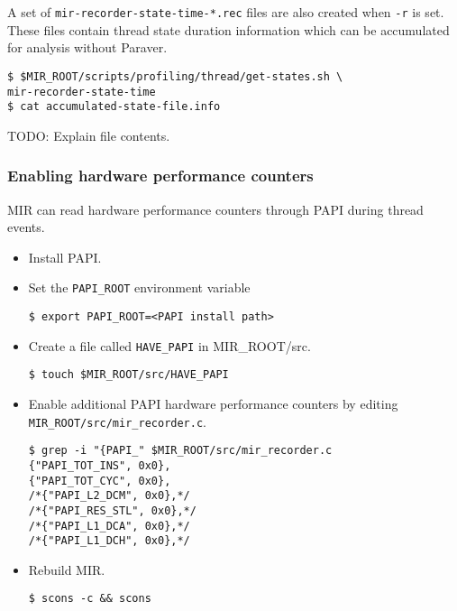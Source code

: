 \documentclass[11pt,a4paper]{article}
\begin{document}
A set of \lstinline!mir-recorder-state-time-*.rec! files are also created when \lstinline!-r! is set. These files contain thread state duration information which can be accumulated for analysis without Paraver.  

\begin{lstlisting}[style=MyInputStyle]
$ $MIR_ROOT/scripts/profiling/thread/get-states.sh \
mir-recorder-state-time
$ cat accumulated-state-file.info
\end{lstlisting}

TODO: Explain file contents.

\subsubsection{Enabling hardware performance counters}\label{enabling-hardware-performance-counters}

MIR can read hardware performance counters through PAPI during thread events.

\begin{itemize}
\item Install PAPI.
\item Set the \lstinline!PAPI_ROOT! environment variable

\begin{lstlisting}[style=MyInputStyle]
$ export PAPI_ROOT=<PAPI install path>
\end{lstlisting}

\item Create a file called \lstinline!HAVE_PAPI! in MIR\_ROOT/src.

\begin{lstlisting}[style=MyInputStyle]
$ touch $MIR_ROOT/src/HAVE_PAPI
\end{lstlisting}

\item Enable additional PAPI hardware performance counters by editing \lstinline!MIR_ROOT/src/mir_recorder.c!.

\begin{lstlisting}[style=MyInputStyle]
$ grep -i "{PAPI_" $MIR_ROOT/src/mir_recorder.c
{"PAPI_TOT_INS", 0x0},
{"PAPI_TOT_CYC", 0x0},
/*{"PAPI_L2_DCM", 0x0},*/
/*{"PAPI_RES_STL", 0x0},*/
/*{"PAPI_L1_DCA", 0x0},*/
/*{"PAPI_L1_DCH", 0x0},*/
\end{lstlisting}

\item Rebuild MIR.

\begin{lstlisting}[style=MyInputStyle]
$ scons -c && scons
\end{lstlisting}
\end{itemize}
\end{document}
